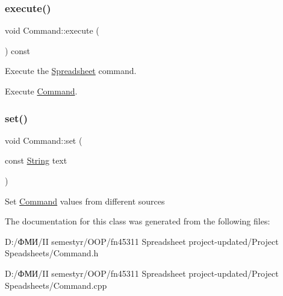 \subsubsection{\texorpdfstring{execute()}{execute()}}
{\footnotesize\ttfamily void Command\+::execute (\begin{DoxyParamCaption}{ }\end{DoxyParamCaption}) const}



Execute the \hyperlink{class_spreadsheet}{Spreadsheet} command. 

Execute \hyperlink{class_command}{Command}. \mbox{\label{class_command_a9209fc53d344c17fe39e27a3ef5d566f}} 
\subsubsection{\texorpdfstring{set()}{set()}}
{\footnotesize\ttfamily void Command\+::set (\begin{DoxyParamCaption}\item[{const \hyperlink{class_string}{String}}]{text }\end{DoxyParamCaption})}

Set \hyperlink{class_command}{Command} values from different sources 

The documentation for this class was generated from the following files\+:\begin{DoxyCompactItemize}
\item 
D\+:/ФМИ/\+I\+I semestyr/\+O\+O\+P/fn45311 Spreadsheet project-\/updated/\+Project Speadsheets/Command.\+h\item 
D\+:/ФМИ/\+I\+I semestyr/\+O\+O\+P/fn45311 Spreadsheet project-\/updated/\+Project Speadsheets/Command.\+cpp\end{DoxyCompactItemize}
